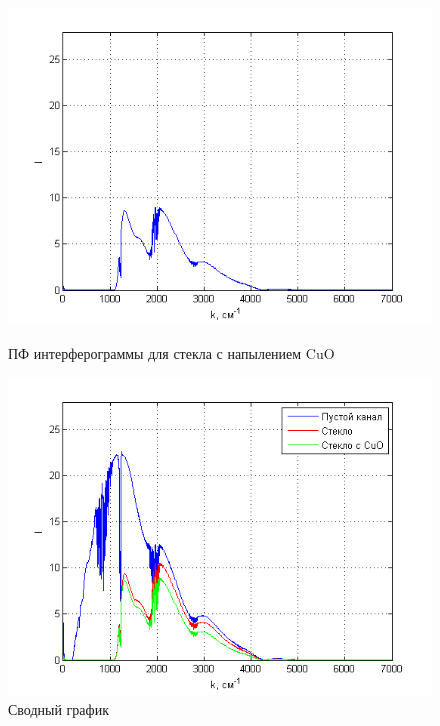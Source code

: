 \documentclass[a4paper,12pt]{article} %
\begin{document}
\begin{figure}[h!]
\begin{center}
            \hfill
            \begin{minipage}[h!]{0.4\linewidth}
                \includegraphics[width=1.2\linewidth]{7.png}
                \caption{ПФ интерферограммы для стекла с напылением CuO}
                \label{picture_7}
            \end{minipage}
            \hfill
            \begin{minipage}[h!]{0.4\linewidth}
                \includegraphics[width=1.2\linewidth]{8.png}
                \caption{Сводный график}
                \label{picture_8}
            \end{minipage}
        \end{center}
    \end{figure}
\end{document}
